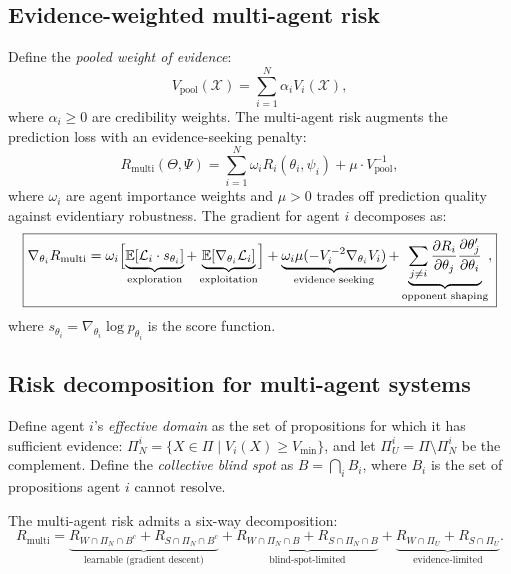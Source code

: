 \subsection{Evidence-weighted multi-agent risk}

Define the \emph{pooled weight of evidence}:
\begin{equation}
\label{eq:pooled-evidence}
    V_{\mathrm{pool}}(\mathcal{X}) = \sum_{i=1}^N \alpha_i V_i(\mathcal{X}),
\end{equation}
where $\alpha_i \geq 0$ are credibility weights. The multi-agent risk augments the prediction loss with an evidence-seeking penalty:
\begin{equation}
\label{eq:multi-agent-risk}
    R_{\mathrm{multi}}(\Theta, \Psi) = \sum_{i=1}^N \omega_i R_i(\theta_i, \psi_i) + \mu \cdot V_{\mathrm{pool}}^{-1},
\end{equation}
where $\omega_i$ are agent importance weights and $\mu > 0$ trades off prediction quality against evidentiary robustness. The gradient for agent $i$ decomposes as:
\begin{equation}
\label{eq:five-component}
\boxed{
    \nabla_{\theta_i} R_{\mathrm{multi}} = \omega_i\Bigl[\underbrace{\mathbb{E}[\mathcal{L}_i \cdot s_{\theta_i}]}_{\text{exploration}} + \underbrace{\mathbb{E}[\nabla_{\theta_i} \mathcal{L}_i]}_{\text{exploitation}}\Bigr] + \underbrace{\omega_i \mu(-V_i^{-2} \nabla_{\theta_i} V_i)}_{\text{evidence seeking}} + \underbrace{\sum_{j \neq i} \frac{\partial R_i}{\partial \theta_j} \frac{\partial \theta_j'}{\partial \theta_i}}_{\text{opponent shaping}},
}
\end{equation}
where $s_{\theta_i} = \nabla_{\theta_i} \log p_{\theta_i}$ is the score function.


\subsection{Risk decomposition for multi-agent systems}
\label{subsec:six-way}

Define agent $i$'s \emph{effective domain} as the set of propositions for which it has sufficient evidence: $\Pi_N^i = \{X \in \Pi \mid V_i(X) \geq V_{\min}\}$, and let $\Pi_U^i = \Pi \setminus \Pi_N^i$ be the complement. Define the \emph{collective blind spot} as $B = \bigcap_i B_i$, where $B_i$ is the set of propositions agent $i$ cannot resolve.

The multi-agent risk admits a six-way decomposition:
\begin{equation}
\label{eq:six-way}
\boxed{
    R_{\mathrm{multi}} = \underbrace{R_{W \cap \Pi_N \cap B^c} + R_{S \cap \Pi_N \cap B^c}}_{\text{learnable (gradient descent)}} + \underbrace{R_{W \cap \Pi_N \cap B} + R_{S \cap \Pi_N \cap B}}_{\text{blind-spot-limited}} + \underbrace{R_{W \cap \Pi_U} + R_{S \cap \Pi_U}}_{\text{evidence-limited}}.
}
\end{equation}

